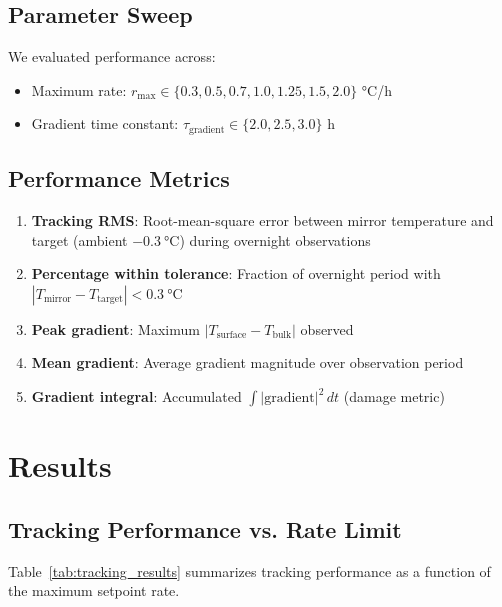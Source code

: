 \documentclass[11pt,a4paper]{article}
\begin{document}
\subsection{Parameter Sweep}

We evaluated performance across:
\begin{itemize}
    \item Maximum rate: $r_{\text{max}} \in \{0.3, 0.5, 0.7, 1.0, 1.25, 1.5, 2.0\}$ \si{\celsius/h}
    \item Gradient time constant: $\tau_{\text{gradient}} \in \{2.0, 2.5, 3.0\}$ \si{h}
\end{itemize}

\subsection{Performance Metrics}

\begin{enumerate}
    \item \textbf{Tracking RMS}: Root-mean-square error between mirror temperature and target (ambient $- \SI{0.3}{\celsius}$) during overnight observations
    \item \textbf{Percentage within tolerance}: Fraction of overnight period with $|T_{\text{mirror}} - T_{\text{target}}| < \SI{0.3}{\celsius}$
    \item \textbf{Peak gradient}: Maximum $|T_{\text{surface}} - T_{\text{bulk}}|$ observed
    \item \textbf{Mean gradient}: Average gradient magnitude over observation period
    \item \textbf{Gradient integral}: Accumulated $\int |\text{gradient}|^2 \, dt$ (damage metric)
\end{enumerate}

\section{Results}

\subsection{Tracking Performance vs. Rate Limit}

Table~\ref{tab:tracking_results} summarizes tracking performance as a function of the maximum setpoint rate.
\end{document}
